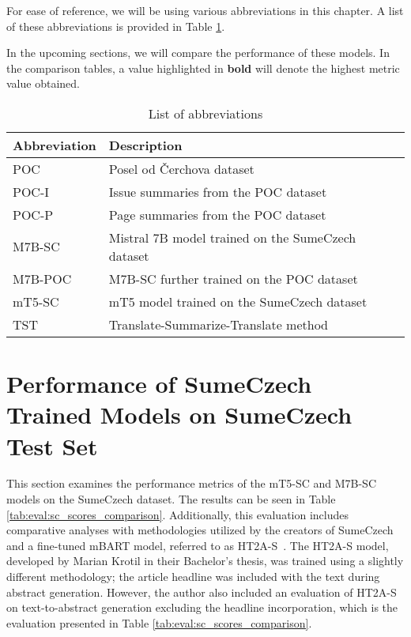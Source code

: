 \documentclass[english, ba, kiv, he, iso690numb, pdf, viewonly]{fasthesis}
\begin{document}
For ease of reference, we will be using various abbreviations in this chapter. A list of these abbreviations is provided in Table \ref{tab:abbreviations}.

In the upcoming sections, we will compare the performance of these models. In the comparison tables, a value highlighted in \textbf{bold} will denote the highest metric value obtained.

\begin{table}[ht]
    \centering
    \caption{List of abbreviations}
    \label{tab:abbreviations}
        \begin{tabular}{ll}
        \hline
        \textbf{Abbreviation} & \textbf{Description}                                             \\ \hline
        POC                   & Posel od Čerchova dataset                                        \\
        POC-I                 & Issue summaries from the POC dataset                             \\
        POC-P                 & Page summaries from the POC dataset                              \\
        M7B-SC                & Mistral 7B model trained on the SumeCzech dataset                 \\
        M7B-POC               & M7B-SC further trained on the POC dataset               \\
        mT5-SC                & mT5 model trained on the SumeCzech dataset                        \\
        TST                   & Translate-Summarize-Translate method                           \\ \hline
    \end{tabular}
\end{table}
 

\section{Performance of SumeCzech Trained Models on SumeCzech Test Set}
This section examines the performance metrics of the mT5-SC and M7B-SC models on the SumeCzech dataset. The results can be seen in Table \ref{tab:eval:sc_scores_comparison}. Additionally, this evaluation includes comparative analyses with methodologies utilized by the creators of SumeCzech and a fine-tuned mBART model, referred to as HT2A-S~\cite{Krotil2022TextSummarization}. The HT2A-S model, developed by Marian Krotil in their Bachelor's thesis, was trained using a slightly different methodology; the article headline was included with the text during abstract generation. However, the author also included an evaluation of HT2A-S on text-to-abstract generation excluding the headline incorporation, which is the evaluation presented in Table \ref{tab:eval:sc_scores_comparison}. 
\end{document}
